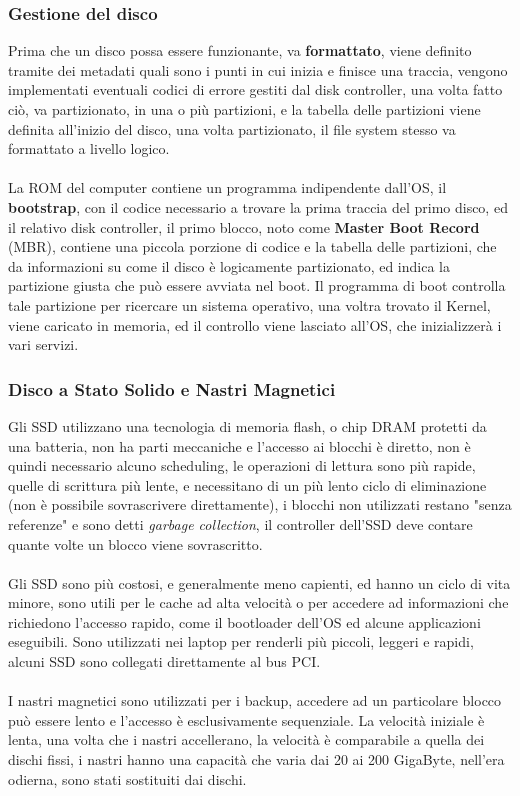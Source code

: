 \documentclass[12pt, letterpaper]{article}
\newcommand{\acc}{\\\hphantom{}\\}
\begin{document}
\subsubsection{Gestione del disco} 
Prima che un disco possa essere funzionante, va \textbf{formattato}, viene definito tramite dei metadati quali sono 
i punti in cui inizia e finisce una traccia, vengono implementati eventuali codici di errore gestiti dal disk 
controller, una volta fatto ciò, va partizionato, in una o più partizioni, e la tabella delle partizioni viene 
definita all'inizio del disco, una volta partizionato, il file system stesso va formattato a livello logico.\acc 
La ROM del computer contiene un programma indipendente dall'OS, il \textbf{bootstrap}, con il codice necessario 
a trovare la prima traccia del primo disco, ed il relativo disk controller, il primo blocco, noto come \textbf{Master 
Boot Record} (MBR), contiene una piccola porzione di codice e la tabella delle partizioni, che da informazioni su come 
il disco è logicamente partizionato, ed indica la partizione giusta che può essere avviata nel boot. Il programma di boot controlla 
tale partizione per ricercare un sistema operativo, una voltra trovato il Kernel, viene caricato in memoria, ed il 
controllo viene lasciato all'OS, che inizializzerà i vari servizi.
\subsubsection{Disco a Stato Solido e Nastri Magnetici}
Gli SSD utilizzano una tecnologia di memoria flash, o chip DRAM protetti da una batteria, non ha parti meccaniche 
e l'accesso ai blocchi è diretto, non è quindi necessario alcuno scheduling, le operazioni di lettura sono più rapide, quelle 
di scrittura più lente, e necessitano di un più lento ciclo di eliminazione (non è possibile sovrascrivere direttamente), 
i blocchi non utilizzati restano "senza referenze" e sono detti \textit{garbage collection}, il controller dell'SSD deve 
contare quante volte un blocco viene sovrascritto.\acc Gli SSD sono più costosi, e generalmente meno capienti, ed hanno 
un ciclo di vita minore, sono utili per le cache ad alta velocità o per accedere ad informazioni che richiedono l'accesso 
rapido, come il bootloader dell'OS ed alcune applicazioni eseguibili. Sono utilizzati nei laptop per renderli 
più piccoli, leggeri e rapidi, alcuni SSD sono collegati direttamente al bus PCI.\acc 
I nastri magnetici sono utilizzati per i backup, accedere ad un particolare blocco può essere lento e l'accesso 
è esclusivamente sequenziale. La velocità iniziale è lenta, una volta che i nastri accellerano, la velocità è comparabile 
a quella dei dischi fissi, i nastri hanno una capacità che varia dai 20 ai 200 GigaByte, nell'era odierna, sono 
stati sostituiti dai dischi.
\end{document}
